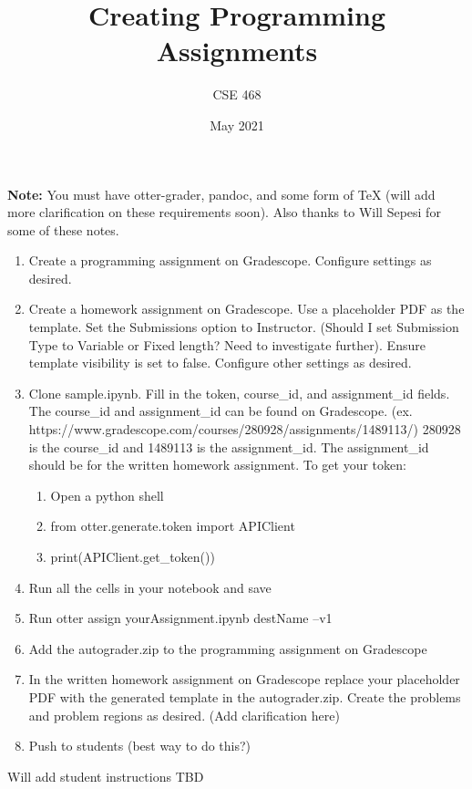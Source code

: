 \documentclass[12pt]{article}
\title{Creating Programming Assignments}
\author{CSE 468}
\date{May 2021}
\begin{document}
\maketitle

\noindent \textbf{Note:} You must have otter-grader, pandoc, and some form of TeX (will add more clarification on these requirements soon). Also thanks to Will Sepesi for some of these notes.

\begin{enumerate}[font=\bfseries]
    \item Create a programming assignment on Gradescope. Configure settings as desired.
    \item Create a homework assignment on Gradescope. Use a placeholder PDF as the template. Set the Submissions option to Instructor. (Should I set Submission Type to Variable or Fixed length? Need to investigate further). Ensure template visibility is set to false. Configure other settings as desired.
    \item Clone sample.ipynb. Fill in the token, course\_id, and assignment\_id fields. The course\_id and assignment\_id can be found on Gradescope. (ex. https://www.gradescope.com/courses/280928/assignments/1489113/) 280928 is the course\_id and 1489113 is the assignment\_id. The assignment\_id should be for the written homework assignment. To get your token:
    \begin{enumerate}
        \item Open a python shell
        \item from otter.generate.token import APIClient
        \item print(APIClient.get\_token())
    \end{enumerate}
    \item Run all the cells in your notebook and save
    \item Run otter assign yourAssignment.ipynb destName --v1
    \item Add the autograder.zip to the programming assignment on Gradescope
    \item In the written homework assignment on Gradescope replace your placeholder PDF with the generated template in the autograder.zip. Create the problems and problem regions as desired. (Add clarification here)
    \item Push to students (best way to do this?)
\end{enumerate}

Will add student instructions TBD
\end{document}
